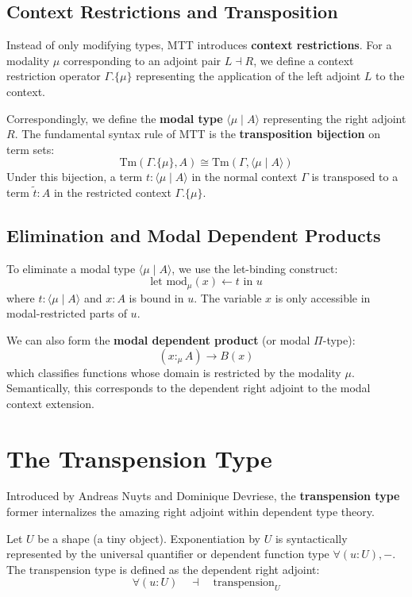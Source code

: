 \documentclass{article}
\begin{document}
\subsection{Context Restrictions and Transposition}
Instead of only modifying types, MTT introduces \textbf{context restrictions}. For a modality $\mu$ corresponding to an adjoint pair $L \dashv R$, we define a context restriction operator $\Gamma.\{\mu\}$ representing the application of the left adjoint $L$ to the context.

Correspondingly, we define the \textbf{modal type} $\langle \mu \mid A \rangle$ representing the right adjoint $R$. The fundamental syntax rule of MTT is the \textbf{transposition bijection} on term sets:
\[
\mathrm{Tm}(\Gamma.\{\mu\}, A) \cong \mathrm{Tm}(\Gamma, \langle \mu \mid A \rangle)
\]
Under this bijection, a term $t : \langle \mu \mid A \rangle$ in the normal context $\Gamma$ is transposed to a term $\widetilde{t} : A$ in the restricted context $\Gamma.\{\mu\}$.

\subsection{Elimination and Modal Dependent Products}
To eliminate a modal type $\langle \mu \mid A \rangle$, we use the let-binding construct:
\[
\text{let } \mathrm{mod}_{\mu}(x) \leftarrow t \text{ in } u
\]
where $t : \langle \mu \mid A \rangle$ and $x : A$ is bound in $u$. The variable $x$ is only accessible in modal-restricted parts of $u$.

We can also form the \textbf{modal dependent product} (or modal $\Pi$-type):
\[
(x :_{\mu} A) \to B(x)
\]
which classifies functions whose domain is restricted by the modality $\mu$. Semantically, this corresponds to the dependent right adjoint to the modal context extension.

\section{The Transpension Type}
Introduced by Andreas Nuyts and Dominique Devriese, the \textbf{transpension type} former internalizes the amazing right adjoint within dependent type theory.

Let $U$ be a shape (a tiny object). Exponentiation by $U$ is syntactically represented by the universal quantifier or dependent function type $\forall(u : U), -$. The transpension type is defined as the dependent right adjoint:
\[
\forall(u : U) \quad \dashv \quad \mathrm{transpension}_U
\]
\end{document}
